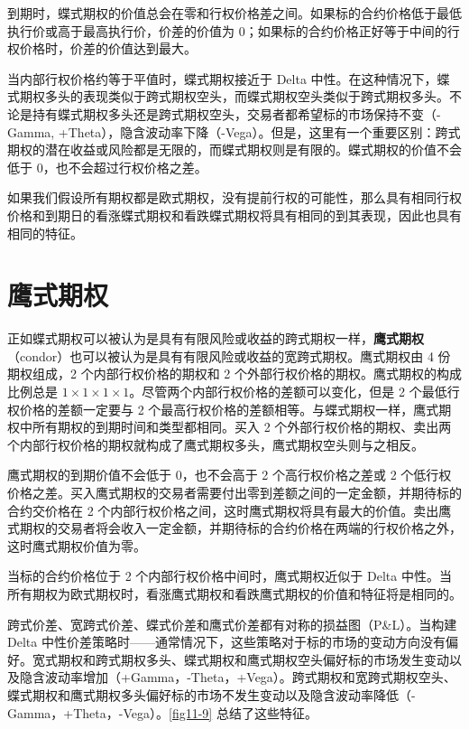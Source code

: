 到期时，蝶式期权的价值总会在零和行权价格差之间。如果标的合约价格低于最低执行价或高于最高执行价，价差的价值为 0；如果标的合约价格正好等于中间的行权价格时，价差的价值达到最大。

当内部行权价格约等于平值时，蝶式期权接近于 Delta 中性。在这种情况下，蝶式期权多头的表现类似于跨式期权空头，而蝶式期权空头类似于跨式期权多头。不论是持有蝶式期权多头还是跨式期权空头，交易者都希望标的市场保持不变（-Gamma, +Theta），隐含波动率下降（-Vega）。但是，这里有一个重要区别：跨式期权的潜在收益或风险都是无限的，而蝶式期权则是有限的。蝶式期权的价值不会低于 0，也不会超过行权价格之差。

如果我们假设所有期权都是欧式期权，没有提前行权的可能性，那么具有相同行权价格和到期日的看涨蝶式期权和看跌蝶式期权将具有相同的到其表现，因此也具有相同的特征。
\section{鹰式期权}
正如蝶式期权可以被认为是具有有限风险或收益的跨式期权一样，\textbf{鹰式期权}（condor）也可以被认为是具有有限风险或收益的宽跨式期权。鹰式期权由 4 份期权组成，2 个内部行权价格的期权和 2 个外部行权价格的期权。鹰式期权的构成比例总是 $1\times 1\times 1\times 1$。尽管两个内部行权价格的差额可以变化，但是 2 个最低行权价格的差额一定要与 2 个最高行权价格的差额相等。与蝶式期权一样，鹰式期权中所有期权的到期时间和类型都相同。买入 2 个外部行权价格的期权、卖出两个内部行权价格的期权就构成了鹰式期权多头，鹰式期权空头则与之相反。

鹰式期权的到期价值不会低于 0，也不会高于 2 个高行权价格之差或 2 个低行权价格之差。买入鹰式期权的交易者需要付出零到差额之间的一定金额，并期待标的合约交价格在 2 个内部行权价格之间，这时鹰式期权将具有最大的价值。卖出鹰式期权的交易者将会收入一定金额，并期待标的合约价格在两端的行权价格之外，这时鹰式期权价值为零。

当标的合约价格位于 2 个内部行权价格中间时，鹰式期权近似于 Delta 中性。当所有期权为欧式期权时，看涨鹰式期权和看跌鹰式期权的价值和特征将是相同的。


跨式价差、宽跨式价差、蝶式价差和鹰式价差都有对称的损益图（P\&L）。当构建 Delta 中性价差策略时——通常情况下，这些策略对于标的市场的变动方向没有偏好。宽式期权和跨式期权多头、蝶式期权和鹰式期权空头偏好标的市场发生变动以及隐含波动率增加（+Gamma，-Theta，+Vega）。跨式期权和宽跨式期权空头、蝶式期权和鹰式期权多头偏好标的市场不发生变动以及隐含波动率降低（-Gamma，+Theta，-Vega）。\autoref{fig11-9} 总结了这些特征。

